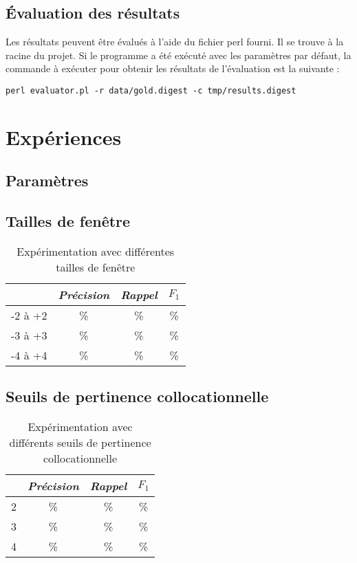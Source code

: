 \documentclass[a4paper]{article}
\begin{document}
\subsection{Évaluation des résultats}

Les résultats peuvent être évalués à l'aide du fichier perl fourni. Il se trouve à la racine du projet. Si le programme a été exécuté avec les paramètres par défaut, la commande à exécuter pour obtenir les résultats de l'évaluation est la suivante :\newline

\texttt{perl evaluator.pl -r data/gold.digest -c tmp/results.digest}

\section{Expériences}

\subsection{Paramètres}

\subsection{Tailles de fenêtre}

\FloatBarrier

\begin{table}[h]
	\centering
	\begin{tabular}{l|c|c|c|}
	\cline{2-4}
		                   & \textit{Précision} & \textit{Rappel} & \textit{$F_1$} \\ \hline
	\multicolumn{1}{|l|}{-2 à +2} & \% & \% & \% \\ \hline
	\multicolumn{1}{|l|}{-3 à +3} & \% & \% & \% \\ \hline
	\multicolumn{1}{|l|}{-4 à +4} & \% & \% & \% \\ \hline
	\end{tabular}
	\caption{Expérimentation avec différentes tailles de fenêtre}
\end{table}

\subsection{Seuils de pertinence collocationnelle}

\FloatBarrier

\begin{table}[h]
	\centering
	\begin{tabular}{l|c|c|c|}
	\cline{2-4}
		                    & \textit{Précision} & \textit{Rappel} & \textit{$F_1$} \\ \hline
	\multicolumn{1}{|l|}{2} & \% & \% & \% \\ \hline
	\multicolumn{1}{|l|}{3} & \% & \% & \% \\ \hline
	\multicolumn{1}{|l|}{4} & \% & \% & \% \\ \hline
	\end{tabular}
	\caption{Expérimentation avec différents seuils de pertinence collocationnelle}
\end{table}
\end{document}

